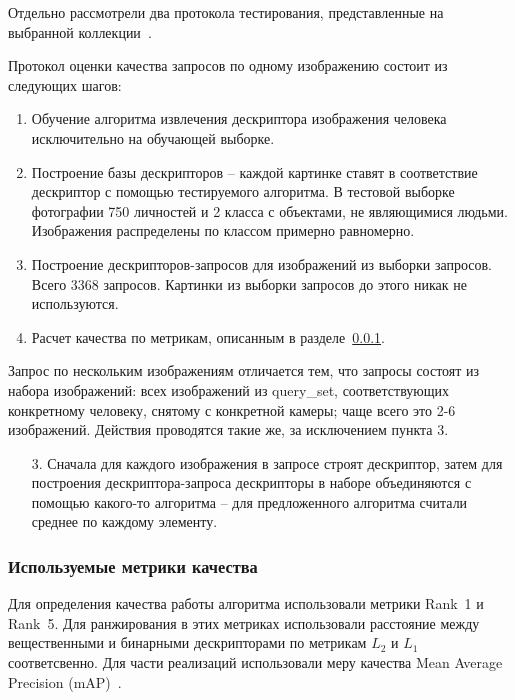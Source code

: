 \documentclass[a4paper,twoside,11pt]{article}
\numberwithin{equation}{section}
\begin{document}
Отдельно рассмотрели два протокола тестирования, представленные на выбранной коллекции~\cite{zheng2015scalable}.

Протокол оценки качества запросов по одному изображению состоит из следующих шагов:

\begin{enumerate}
    \item Обучение алгоритма извлечения дескриптора изображения человека исключительно на обучающей выборке.
    \item Построение базы дескрипторов -- каждой картинке ставят в соответствие дескриптор с помощью тестируемого алгоритма. В тестовой выборке фотографии 750 личностей и 2 класса с объектами, не являющимися людьми. Изображения распределены по классом примерно равномерно.
    \item Построение дескрипторов-запросов для изображений из выборки запросов. Всего 3368 запросов. Картинки из выборки запросов до этого никак не используются.
    \item Расчет качества по метрикам, описанным в разделе~\ref{sec:metrics}.
\end{enumerate}

Запрос по нескольким изображениям отличается тем, что запросы состоят из набора изображений: всех изображений из query\_set, соответствующих конкретному человеку, снятому с конкретной камеры; чаще всего это 2-6 изображений. Действия проводятся такие же, за исключением пункта 3.

\begin{enumerate}
    \item[3.] Сначала для каждого изображения в запросе строят дескриптор, затем для построения дескриптора-запроса дескрипторы в наборе объединяются с помощью какого-то алгоритма -- для предложенного алгоритма считали среднее по каждому элементу.
\end{enumerate}

\subsubsection{Используемые метрики качества}
\label{sec:metrics}

Для определения качества работы алгоритма использовали метрики Rank~1 и Rank~5. Для ранжирования в этих метриках использовали расстояние между вещественными и бинарными дескрипторами по метрикам $L_2$ и $L_1$ соответсвенно. Для части реализаций использовали меру качества Mean Average Precision (mAP)~\cite{wiki:informationalretrieval}.
\end{document}
